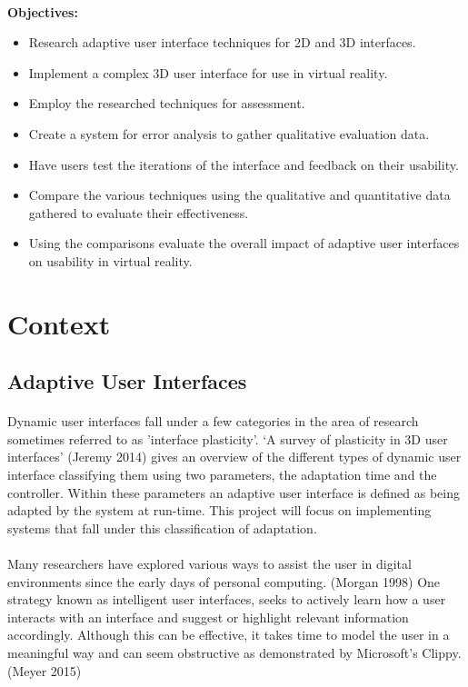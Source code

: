 \documentclass[11pt]{article}
\begin{document}
\paragraph{} 
\textbf{Objectives:}
\begin{itemize}
\item Research adaptive user interface techniques for 2D and 3D interfaces.
\item Implement a complex 3D user interface for use in virtual reality.
\item Employ the researched techniques for assessment.
\item Create a system for error analysis to gather qualitative evaluation data.
\item Have users test the iterations of the interface and feedback on their usability.
\item Compare the various techniques using the qualitative and quantitative data gathered to evaluate their effectiveness.
\item Using the comparisons evaluate the overall impact of adaptive user interfaces on usability in virtual reality.
\end{itemize}

\section{Context}

\subsection{Adaptive User Interfaces}

\paragraph{}
Dynamic user interfaces fall under a few categories in the area of research sometimes referred to as 'interface plasticity'. ‘A survey of plasticity in 3D user interfaces' (Jeremy 2014) gives an overview of the different types of dynamic user interface classifying them using two parameters, the adaptation time and the controller. Within these parameters an adaptive user interface is defined as being adapted by the system at run-time. This project will focus on implementing systems that fall under this classification of adaptation.

\paragraph{} 
Many researchers have explored various ways to assist the user in digital environments since the early days of personal computing. (Morgan 1998) One strategy known as intelligent user interfaces, seeks to actively learn how a user interacts with an interface and suggest or highlight relevant information accordingly. Although this can be effective, it takes time to model the user in a meaningful way and can seem obstructive as demonstrated by Microsoft's Clippy. (Meyer 2015)
\end{document}

